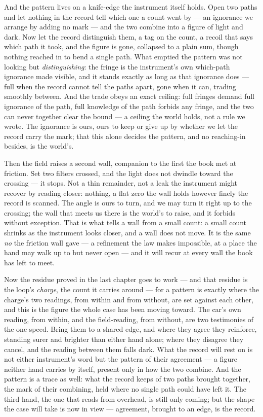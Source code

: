 And the pattern lives on a knife-edge the instrument itself holds. Open two paths and let nothing in the record
tell which one a count went by --- an ignorance we arrange by adding no mark --- and the two combine into a
figure of light and dark. Now let the record distinguish them, a tag on the count, a recoil that says which
path it took, and the figure is gone, collapsed to a plain sum, though nothing reached in to bend a single
path. What emptied the pattern was not looking but \emph{distinguishing}: the fringe is the instrument's own
which-path ignorance made visible, and it stands exactly as long as that ignorance does --- full when the
record cannot tell the paths apart, gone when it can, trading smoothly between. And the trade obeys an exact
ceiling: full fringes demand full ignorance of the path, full knowledge of the path forbids any fringe, and the
two can never together clear the bound --- a ceiling the world holds, not a rule we wrote. The ignorance is
ours, ours to keep or give up by whether we let the record carry the mark; that this alone decides the pattern,
and no reaching-in besides, is the world's.

Then the field raises a second wall, companion to the first the book met at friction. Set two filters crossed,
and the light does not dwindle toward the crossing --- it stops. Not a thin remainder, not a leak the
instrument might recover by reading closer: nothing, a flat zero the wall holds however finely the record is
scanned. The angle is ours to turn, and we may turn it right up to the crossing; the wall that meets us there
is the world's to raise, and it forbids without exception. That is what tells a wall from a small count: a small
count shrinks as the instrument looks closer, and a wall does not move. It is the same \emph{no} the friction
wall gave ---
a refinement the law makes impossible, at a place the hand may walk up to but never open --- and it will recur
at every wall the book has left to meet.

Now the residue proved in the last chapter goes to work --- and that residue is the loop's \emph{charge}, the
count it carries around --- for a pattern is exactly where the charge's two readings, from within and from
without, are set against each other, and this is the figure the whole case has been moving toward. The car's
own reading, from within, and the field-reading, from without, are two testimonies of the one speed. Bring them
to a shared edge, and where they agree they reinforce, standing surer and brighter than either hand alone;
where they disagree they cancel, and the reading between them falls dark. What the record will rest on is not
either instrument's word but the pattern of their agreement --- a figure neither hand carries by itself,
present only in how the two combine. And the pattern is a trace as well: what the record keeps of two paths
brought together, the mark of their combining, held where no single path could have left it. The third hand,
the one that reads from overhead, is still only coming; but the shape the case will take is now in view ---
agreement, brought to an edge, is the record.

